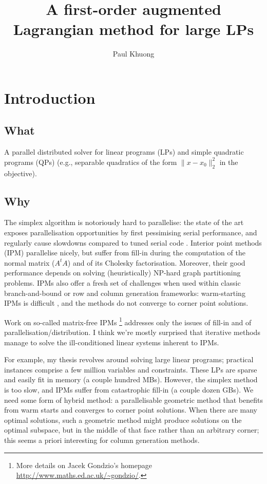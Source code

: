 \documentclass{article}
\title{A first-order augmented Lagrangian method for large LPs}
\author{Paul Khuong}
\begin{document}
\maketitle
\section{Introduction}
\subsection{What}
A parallel distributed solver for linear programs (LPs) and simple
quadratic programs (QPs) (e.g., separable quadratics of the form
\(\|x-x_0\|^2_2\) in the objective).

\subsection{Why}
The simplex algorithm is notoriously hard to parallelise: the state of
the art exposes parallelisation opportunities by first pessimising
serial performance, and regularly cause slowdowns compared to tuned
serial code \citep{Hall:2010tr,Hall:2012he}.  Interior point methods
(IPM) parallelise nicely, but suffer from fill-in during the
computation of the normal matrix (\(A^tA\)) and of its Cholesky
factorisation.  Moreover, their good performance depends on solving
(heuristically) NP-hard graph partitioning problems.  IPMs also offer
a fresh set of challenges when used within classic branch-and-bound or
row and column generation frameworks\citep{Gondzio:2013to}:
warm-starting IPMs is difficult \citep{Gondzio:1998ta,John:2007jm},
and the methods do not converge to corner point solutions.

Work on so-called matrix-free IPMs
\citep{AlJeiroudi:2008td,Smith:2010wh}\footnote{More details on Jacek
  Gondzio's homepage \url{http://www.maths.ed.ac.uk/~gondzio/}.}
addresses only the issues of fill-in and of
parallelisation/distribution. I think we're mostly surprised that
iterative methods manage to solve the ill-conditioned linear systems
inherent to IPMs.

For example, my thesis revolves around solving large linear programs;
practical instances comprise a few million variables and constraints.
These LPs are sparse and easily fit in memory (a couple hundred MBs).
However, the simplex method is too slow, and IPMs suffer from
catastrophic fill-in (a couple dozen GBs).  We need some form of
hybrid method: a parallelisable geometric method that benefits from
warm starts and converges to corner point solutions.  When there are
many optimal solutions, such a geometric method might produce
solutions on the optimal subspace, but in the middle of that face
rather than an arbitrary corner; this seems a priori interesting for
column generation methods.
\end{document}
